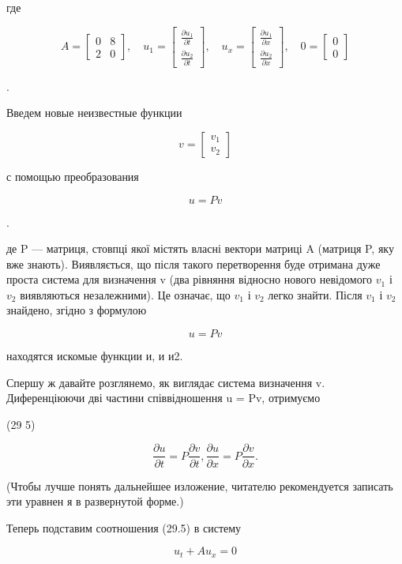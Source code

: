\documentclass[
  ukrainian,
]{article}
\begin{document}
где

\[
A =
\begin{bmatrix} 0 & 8 \\ 2 & 0 \end{bmatrix}
, \quad u_1 =
\begin{bmatrix} \frac{\partial u_1}{\partial t} \\ \frac{\partial u_2}{\partial t} \end{bmatrix}
, \quad u_x =
\begin{bmatrix} \frac{\partial u_1}{\partial x} \\ \frac{\partial u_2}{\partial x} \end{bmatrix}
, \quad 0 =
\begin{bmatrix} 0 \\ 0 \end{bmatrix}
\]

.

Введем новые неизвестные функции

\[
v =
\begin{bmatrix} v_1 \\ v_2 \end{bmatrix}
\]

с помощью преобразования

\[
u = Pv
\]

.

де P --- матриця, стовпці якої містять власні вектори матриці A (матриця
P, яку вже знають). Виявляється, що після такого перетворення буде
отримана дуже проста система для визначення v (два рівняння відносно
нового невідомого \(v_1\) і \(v_2\) виявляються незалежними). Це
означає, що \(v_1\) і \(v_2\) легко знайти. Після \(v_1\) і \(v_2\)
знайдено, згідно з формулою

\[
u = Pv
\]

находятся искомые функции и, и и2.

Спершу ж давайте розглянемо, як виглядає система визначення v.
Диференціюючи дві частини співвідношення u = Pv, отримуємо

(29 5)

\[
\frac{\partial u}{\partial t} = P \frac{\partial v}{\partial t},
\frac{\partial u}{\partial x} = P \frac{\partial v}{\partial x}.
\]

(Чтобы лучше понять дальнейшее изложение, читателю рекомендуется
записать эти уравнен я в развернутой форме.)

Теперь подставим соотношения (29.5) в систему

\[
u_t + Au_x = 0
\]
\end{document}
